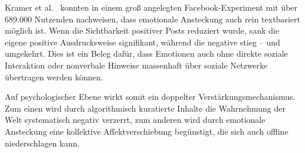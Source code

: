 Kramer et al.~\cite{doi:10.1073/pnas.1320040111} konnten in einem groß angelegten Facebook-Experiment mit über 689.000
Nutzenden nachweisen, dass emotionale Ansteckung auch rein textbasiert möglich ist.
Wenn die Sichtbarkeit positiver Posts reduziert wurde, sank die eigene positive Ausdrucksweise signifikant, während die
negative stieg – und umgekehrt.
Dies ist ein Beleg dafür, dass Emotionen auch ohne direkte soziale Interaktion oder nonverbale Hinweise massenhaft über
soziale Netzwerke übertragen werden können.

Auf psychologischer Ebene wirkt somit ein doppelter Verstärkungsmechanismus.
Zum einen wird durch algorithmisch kuratierte Inhalte die Wahrnehmung der Welt systematisch negativ verzerrt, zum anderen
wird durch emotionale Ansteckung eine kollektive Affektverschiebung begünstigt, die sich auch offline niederschlagen
kann.

